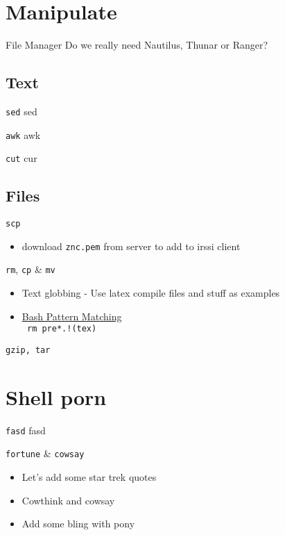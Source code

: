 \documentclass[11pt]{beamer}
\begin{document}
	\section{Manipulate}
		\begin{frame}{File Manager}
			Do we really need Nautilus, Thunar or Ranger?	
		\end{frame}
		\subsection{Text}
			\begin{frame}{ \texttt{sed}}
				sed
			\end{frame}
			\begin{frame}{ \texttt{awk}}
				awk
			\end{frame}
			\begin{frame}{ \texttt{cut}}
				cur
			\end{frame}
		\subsection{Files}
			\begin{frame}{ \texttt{scp}}
				\begin{itemize}
					\item download \texttt{znc.pem} from server to add to irssi client
				\end{itemize}			
			\end{frame}
			\begin{frame}{ \texttt{rm}, \texttt{cp} \& \texttt{mv}}
				\begin{itemize}
					\item Text globbing - Use latex compile files and stuff as examples
					\item \href{https://www.gnu.org/software/bash/manual/bashref.html#Pattern-Matching}{Bash Pattern Matching} \\
						\texttt{ rm pre*.!(tex) }
				\end{itemize}	
			\end{frame}
			\begin{frame}{ \texttt{gzip, tar}}
				
			\end{frame}

	\section{Shell porn}
		\begin{frame}{\texttt{fasd}}
			fasd
		\end{frame}
		\begin{frame}{\texttt{fortune} \& \texttt{cowsay}}
			\begin{itemize}
				\item Let's add some star trek quotes
				\item Cowthink and cowsay
				\item Add some bling with pony
			\end{itemize}
		\end{frame}
\end{document}

